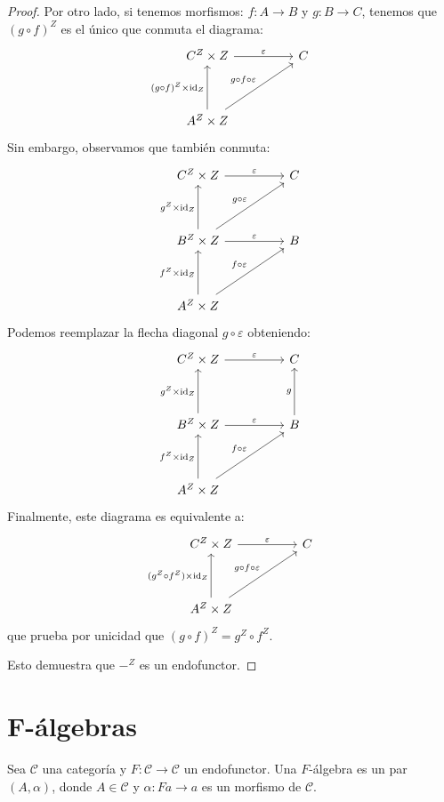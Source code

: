 \documentclass[12pt, twoside]{book}
\newcommand{\cat}{{\mathcal{C}}}
\DeclareMathOperator{\id}{id}
\begin{document}
\begin{proof}
Por otro lado, si tenemos morfismos: $f \colon A \to B$ y $g \colon B \to C$, tenemos que $(g \circ f)^Z$ es el único que conmuta el diagrama:
\[
\begin{tikzcd}
C^Z \times Z \arrow[rr,"\varepsilon"] & & C \\\\
A^Z \times Z \arrow[uu,"(g \circ f)^Z \times\id_Z"]  \arrow[uurr,"g \circ f \circ \varepsilon"]
\end{tikzcd}
\]
Sin embargo, observamos que también conmuta:
\[
\begin{tikzcd}
C^Z \times Z \arrow[rr,"\varepsilon"] & & C\\\\
B^Z \times Z \arrow[rr,"\varepsilon"] \arrow[uu,"g^Z \times \id_Z"] \arrow[uurr,"g \circ \varepsilon"] & & B \\\\
A^Z \times Z \arrow[uu,"f^Z \times\id_Z"]  \arrow[uurr,"f \circ \varepsilon"]
\end{tikzcd}
\]
Podemos reemplazar la flecha diagonal $g \circ \varepsilon$ obteniendo:
\[
\begin{tikzcd}
C^Z \times Z \arrow[rr,"\varepsilon"] & & C\\\\
B^Z \times Z \arrow[rr,"\varepsilon"] \arrow[uu,"g^Z \times \id_Z"] & & B \arrow[uu,"g"] \\\\
A^Z \times Z \arrow[uu,"f^Z \times\id_Z"]  \arrow[uurr,"f \circ \varepsilon"]
\end{tikzcd}
\]
Finalmente, este diagrama es equivalente a:
\[
\begin{tikzcd}
C^Z \times Z \arrow[rr,"\varepsilon"] & & C\\\\
A^Z \times Z \arrow[uu,"(g^Z \circ f^Z) \times\id_Z"]  \arrow[uurr,"g \circ f \circ \varepsilon"]
\end{tikzcd}
\]
que prueba por unicidad que $(g \circ f)^Z = g^Z \circ f^Z$.

Esto demuestra que $-^Z$ es un endofunctor.
\end{proof}

\chapter{F-álgebras}
\begin{definition}
Sea $\cat$ una categoría y $F \colon \cat \to \cat$ un endofunctor.
Una $F$-álgebra es un par $(A,\alpha)$, donde $A \in \cat$ y $\alpha \colon F a \to a$ es un morfismo de $\cat$.
\end{definition}
\end{document}
